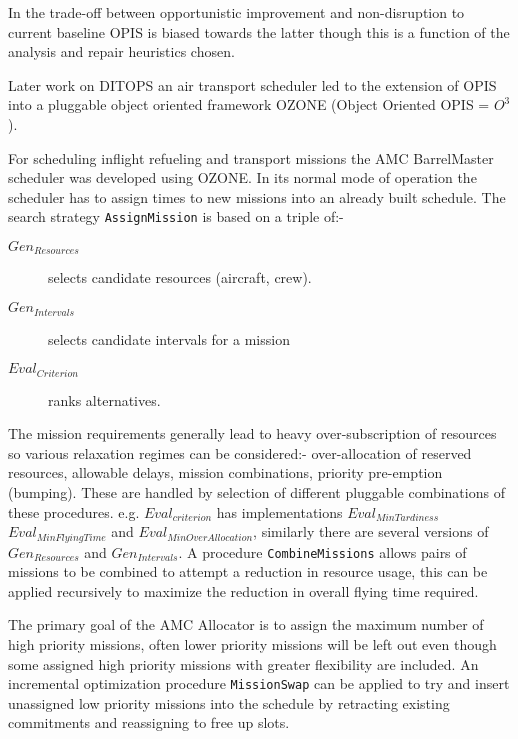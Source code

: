 In the trade-off between opportunistic improvement and non-disruption to current baseline OPIS is biased towards the latter though this is a function of the analysis and repair heuristics chosen.%


Later work on DITOPS \citep{smith96mixed, smith94toward} an air transport scheduler led to the extension of OPIS into a pluggable object oriented framework OZONE (Object Oriented OPIS = $O^3$). %

For scheduling inflight refueling and transport missions the AMC BarrelMaster scheduler \citep{smith04continuous} was developed using OZONE. In its normal mode of operation the scheduler has to assign times to new missions into an already built schedule. The search strategy \texttt{AssignMission} is based on a triple of:-
\begin{description}
\item[$Gen_{Resources}$] selects candidate resources (aircraft, crew).
\item[$Gen_{Intervals}$] selects candidate intervals for a mission
\item[$Eval_{Criterion}$] ranks alternatives.
\end{description}

The mission requirements generally lead to heavy over-subscription of resources so various relaxation regimes can be considered:- over-allocation of reserved resources, allowable delays, mission combinations, priority pre-emption (bumping). These are handled by selection of different pluggable combinations of these procedures. e.g. $Eval_{criterion}$ has implementations $Eval_{MinTardiness}$ $Eval_{MinFlyingTime}$ and $Eval_{MinOverAllocation}$, similarly there are several versions of $Gen_{Resources}$ and $Gen_{Intervals}$. A procedure \texttt{CombineMissions} allows pairs of missions to be combined to attempt a reduction in resource usage, this can be applied recursively to maximize the reduction in overall flying time required. 

The primary goal of the AMC Allocator is to assign the maximum number of high priority missions, often lower priority missions will be left out even though some assigned high priority missions with greater flexibility are included. An incremental optimization procedure \texttt{MissionSwap} can be applied to try and insert unassigned low priority missions into the schedule by retracting existing commitments and reassigning to free up slots. 

